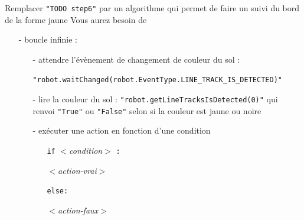 \documentclass{report}
\begin{document}
\begin{itemize}
\step Remplacer \texttt{"TODO step6"} par un algorithme qui permet de faire un suivi du bord de la forme jaune
\step Vous aurez besoin de
    \begin{itemize}
    \item[-] boucle infinie :
    \begin{itemize}
    \item[-] attendre l'évènement de changement de couleur du sol :
    \item[]  \texttt{"robot.waitChanged(robot.EventType.LINE\_TRACK\_IS\_DETECTED)"}
    \item[-] lire la couleur du sol : \texttt{"robot.getLineTracksIsDetected(0)"} qui renvoi \texttt{"True"} ou \texttt{"False"} selon si la couleur est jaune ou noire
    \item[-] exécuter une action en fonction d'une condition
        \begin{itemize}
            \item[] \texttt{if} $<$\textit{condition}$>$ \texttt{:}
            \item[] \hspace{5mm} $<$\textit{action-vrai}$>$
            \item[] \texttt{else:}
            \item[] \hspace{5mm} $<$\textit{action-faux}$>$
        \end{itemize}
    \end{itemize}
    \end{itemize}
\end{itemize}
\end{document}
